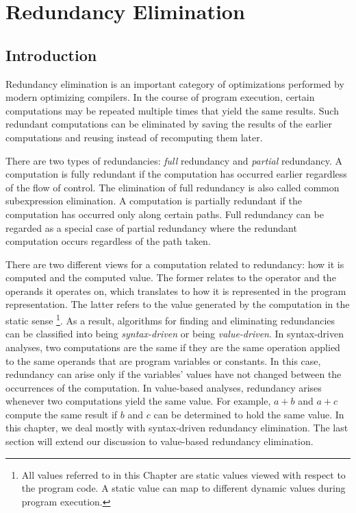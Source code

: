 \chapter{Redundancy Elimination}
\label{chapter:pre_not_helped}

\section{Introduction}
\label{section:Part3:Pre_not_helped:Intro}

Redundancy elimination is an important category of optimizations performed by modern optimizing compilers. 
In the course of program execution, certain computations may be repeated multiple times that yield the same results. 
Such redundant computations can be eliminated by saving the results of the earlier computations and reusing instead of recomputing them later.

There are two types of redundancies: 
\emph{full} redundancy and \emph{partial} redundancy. 
A computation is fully redundant if the computation has occurred earlier regardless of the flow of control. 
The elimination of full redundancy is also called common subexpression elimination. 
A computation is partially redundant if the computation has occurred only along certain paths. 
Full redundancy can be regarded as a special case of partial redundancy where the redundant computation occurs regardless of the path taken.

There are two different views for a computation related to redundancy: 
how it is computed and the computed value. 
The former relates to the operator and the operands it operates on, which translates to how it is represented in the program representation. 
The latter refers to the value generated by the computation in the static sense
\footnote{All values referred to in this Chapter are static values viewed with respect to the program code. 
  A static value can map to different dynamic values during program execution.}. 
As a result, algorithms for finding and eliminating redundancies can be classified into being \emph{syntax-driven} or being \emph{value-driven}. 
In syntax-driven analyses, two computations are the same if they are the same operation applied to the same operands that are program variables or constants. 
In this case, redundancy can arise only if the variables' values have not changed between the occurrences of the computation. 
In value-based analyses, redundancy arises whenever two computations yield the same value. 
For example, $a+b$ and $a+c$ compute the same result if $b$ and $c$ can be determined to hold the same value. 
In this chapter, we deal mostly with syntax-driven redundancy elimination. 
The last section will extend our discussion to value-based redundancy elimination.

